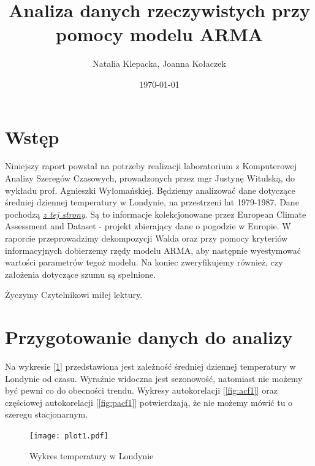 \documentclass{article}
\title{Analiza danych rzeczywistych przy pomocy modelu ARMA}
\author{Natalia Klepacka, Joanna Kołaczek}
\date{\today}
\theoremstyle{break}
\begin{document}
	\maketitle
	\tableofcontents
	\clearpage
	\section{Wstęp}
	Niniejszy raport powstał na potrzeby realizacji laboratorium z Komputerowej Analizy Szeregów Czasowych, prowadzonych przez mgr Justynę Witulską, do wykładu prof. Agnieszki Wyłomańskiej.
	Będziemy analizować dane dotyczące średniej dziennej temperatury w Londynie, na przestrzeni lat 1979-1987. Dane pochodzą \href{https://www.kaggle.com/datasets/emmanuelfwerr/london-weather-data }{\textit{z tej strony}}. Są to informacje kolekcjonowane przez European Climate Assessment and Dataset - projekt zbierający dane o pogodzie w Europie.
	W raporcie przeprowadzimy dekompozycji Walda oraz przy pomocy kryteriów informacyjnych dobierzemy rzędy modelu ARMA, aby następnie wyestymować wartości parametrów tegoż modelu. Na koniec zweryfikujemy również, czy założenia dotyczące szumu są spełnione.
	
	Życzymy Czytelnikowi miłej lektury.
	
	\section{Przygotowanie danych do analizy}
	
	Na wykresie [\ref{fig:p1}] przedstawiona jest zależność średniej dziennej temperatury w Londynie od czasu. Wyraźnie widoczna jest sezonowość, natomiast nie możemy być pewni co do obecności trendu. Wykresy autokorelacji [\ref{fig:acf1}] oraz częściowej autokorelacji [\ref{fig:pacf1}] potwierdzają, że nie możemy mówić tu o szeregu stacjonarnym.
	
	\begin{figure}[H]
		\begin{center}
			\texttt{[image: plot1.pdf]}
			\caption{Wykres temperatury w Londynie}
			\label{fig:p1}
		\end{center}
	\end{figure}
	
\end{document}
